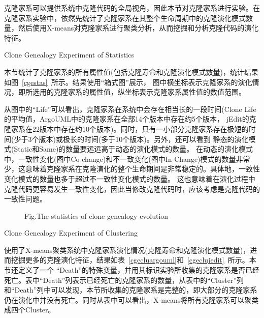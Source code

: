 克隆家系可以提供系统中克隆代码的全局视角，因此本节对克隆家系进行实验。在克隆家系实验中，依然先统计了克隆家系在其整个生命周期中的克隆演化模式数量，然后使用X-means对克隆家系进行聚类分析，从而挖掘和分析克隆代码的演化特征。

{Clone Genealogy Experiment of Statistics} 

本节统计了克隆家系的所有属性值(包括克隆寿命和克隆演化模式数量)，统计结果如图~\ref{cgestas}~所示。结果使用“箱式图”展示， 图中横坐标表示克隆家系的演化情况，即所选用的克隆家系的属性值，纵坐标表示克隆家系属性值的数值范围。
 
从图中的“Life”可以看出，克隆家系在系统中会存在相当长的一段时间(Clone Life的平均值，ArgoUML中的克隆家系在全部14个版本中存在约5个版本， jEdit的克隆家系在22版本中存在约10个版本)。同时，只有一小部分克隆家系存在极短的时间(少于3个版本)或极长的时间(多于10个版本)。另外，还可以看到 静态的演化模式(Static和Same)的数量要远远高于动态的演化模式的数量。 在动态的演化模式中，一致性变化(图中Co-change)和不一致变化(图中In-Change)模式的数量非常少，这意味着克隆家系在克隆演化的整个生命期间是非常稳定的。具体地，一致性变化模式的数量也多于超过不一致性变化模式的数量。 这也意味着在演化过程中克隆代码更容易发生一致性变化，因此当修改克隆代码时，应该考虑是克隆代码的一致性问题。

\begin{figure}[htbp]
\centering
\subfigure{\label{cgestargo}}
\addtocounter{subfigure}{-2}
\subfigure{\label{cgestjedit}}
\addtocounter{subfigure}{-2}
{Fig.$\!$}{The statistics of clone genealogy evolution}
\vspace{-1em}
\end{figure}
 
{Clone Genealogy Experiment of Clustering} 

使用了X-means聚类系统中克隆家系演化情况(克隆寿命和克隆演化模式数量)，进而挖掘更多的克隆演化特征，结果如表~\ref{cgecluargouml}和~\ref{cgeclujedit}~所示。本节还定义了一个 “Death”的特殊变量，并用其标识实验所收集的克隆家系是否已经死亡。表中“Death”列表示已经死亡的克隆家系的数量，从表中的“Cluster”列和“Death”列中可以发现，本节所收集的克隆家系是完整的，即大部分的克隆家系仍在演化中并没有死亡。同时从表中可以看出，X-means将所有克隆家系可以聚类成四个Cluster。

